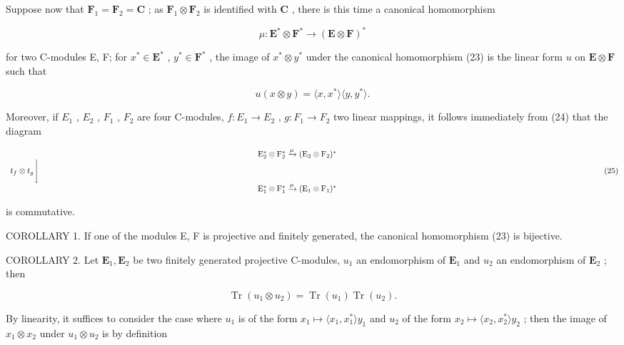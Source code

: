 Suppose now that \(\mathbf{F}_1 = \mathbf{F}_2 = \mathbf{C}\) ; as \(\mathbf{F}_1 \otimes \mathbf{F}_2\) is identified with \(\mathbf{C}\) , there is this time a canonical homomorphism

\[
\mu : \mathbf {E} ^ {*} \otimes \mathbf {F} ^ {*} \rightarrow (\mathbf {E} \otimes \mathbf {F}) ^ {*}\tag{23}
\]

for two C-modules E, F; for \(x^{*} \in \mathbf{E}^{*}\) , \(y^{*} \in \mathbf{F}^{*}\) , the image of \(x^{*} \otimes y^{*}\) under the canonical homomorphism (23) is the linear form \(u\) on \(\mathbf{E} \otimes \mathbf{F}\) such that

\[
u (x \otimes y) = \langle x, x ^ {*} \rangle \langle y, y ^ {*} \rangle .\tag{24}
\]

Moreover, if \(E_{1}\) , \(E_{2}\) , \(F_{1}\) , \(F_{2}\) are four C-modules, \(f: E_{1} \rightarrow E_{2}\) , \(g: F_{1} \rightarrow F_{2}\) two linear mappings, it follows immediately from (24) that the diagram

\[
\begin{array}{c} \mathrm{E} _ {2} ^ {*} \otimes \mathrm{F} _ {2} ^ {*} \xrightarrow {\mu} (\mathrm{E} _ {2} \otimes \mathrm{F} _ {2}) ^ {*} \\ t _ {f} \otimes t _ {g} \Biggl \downarrow \qquad \qquad \qquad \qquad \qquad \qquad \qquad \qquad \qquad \qquad \qquad \qquad \qquad \qquad \qquad \qquad \qquad \qquad \qquad \qquad \qquad \qquad \qquad \qquad \qquad \qquad \qquad \qquad \qquad \qquad \qquad \qquad \qquad \qquad \\ \mathrm{E} _ {1} ^ {*} \otimes \mathrm{F} _ {1} ^ {*} \xrightarrow {\mu} (\mathrm{E} _ {1} \otimes \mathrm{F} _ {1}) ^ {*} \end{array}\tag{25}
\]

is commutative.

COROLLARY 1. If one of the modules E, F is projective and finitely generated, the canonical homomorphism (23) is bijective.

COROLLARY 2. Let \(\mathbf{E}_1, \mathbf{E}_2\) be two finitely generated projective C-modules, \(u_1\) an endomorphism of \(\mathbf{E}_1\) and \(u_2\) an endomorphism of \(\mathbf{E}_2\) ; then

\[
\operatorname{Tr} (u _ {1} \otimes u _ {2}) = \operatorname{Tr} (u _ {1}) \operatorname{Tr} (u _ {2}).\tag{26}
\]

By linearity, it suffices to consider the case where \(u_{1}\) is of the form \(x_{1} \mapsto \langle x_{1}, x_{1}^{*} \rangle y_{1}\) and \(u_{2}\) of the form \(x_{2} \mapsto \langle x_{2}, x_{2}^{*} \rangle y_{2}\) ; then the image of \(x_{1} \otimes x_{2}\) under \(u_{1} \otimes u_{2}\) is by definition

